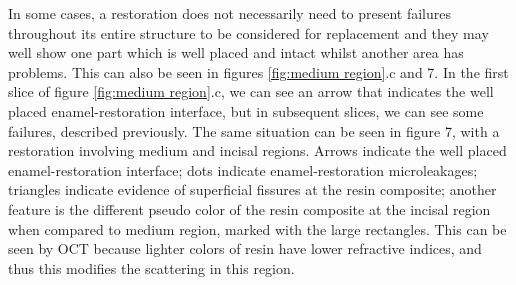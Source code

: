 \documentclass[12pt,twoside,english]{book}
\renewcommand{\~}{\perispomeni}%
\numberwithin{equation}{section}
\numberwithin{figure}{section}
\begin{document}
In some cases, a restoration does not necessarily need to present failures throughout its entire structure to be considered for replacement and they may well show one part which is well placed and intact whilst another area has problems. This can also be seen in figures \ref{fig:medium region}.c and 7. In the first slice of figure \ref{fig:medium region}.c, we can see an arrow that indicates the well placed enamel-restoration interface, but in subsequent slices, we can see some failures, described previously. The same situation can be seen in figure 7, with a restoration involving medium and incisal regions. Arrows indicate the well placed enamel-restoration interface; dots indicate enamel-restoration microleakages; triangles indicate evidence of superficial fissures at the resin composite; another feature is the different pseudo color of the resin composite at the incisal region when compared to medium region, marked with the large rectangles. This can be seen by OCT because lighter colors of resin have lower refractive indices, and thus this modifies the scattering in this region.
\end{document}
